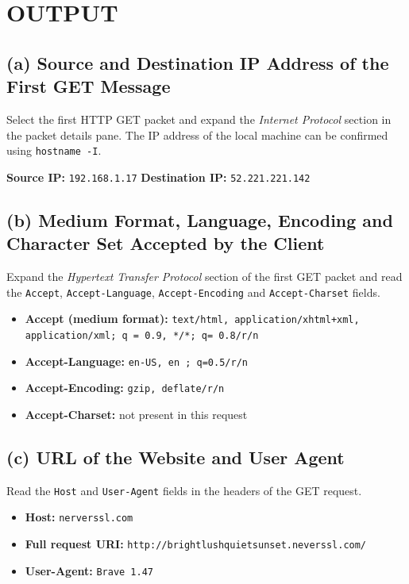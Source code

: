 \documentclass[12pt,a4paper]{article}
\begin{document}
	\section*{OUTPUT}

	
	\subsection*{(a) Source and Destination IP Address of the First GET Message}
	Select the first HTTP GET packet and expand the \textit{Internet Protocol} section in the packet details pane. The IP address of the local machine can be confirmed using \texttt{hostname -I}.
	
	\textbf{Source IP:} \texttt{192.168.1.17} \hfill \textbf{Destination IP:} \texttt{52.221.221.142}
	
	\subsection*{(b) Medium Format, Language, Encoding and Character Set Accepted by the Client}
	Expand the \textit{Hypertext Transfer Protocol} section of the first GET packet and read the \texttt{Accept}, \texttt{Accept-Language}, \texttt{Accept-Encoding} and \texttt{Accept-Charset} fields.
	
	\begin{itemize}
		\item \textbf{Accept (medium format):} \texttt{text/html, application/xhtml+xml, application/xml; q = 0.9, */*; q= 0.8/r/n}
		\item \textbf{Accept-Language:} \texttt{en-US, en ; q=0.5/r/n}
		\item \textbf{Accept-Encoding:} \texttt{gzip, deflate/r/n}
		\item \textbf{Accept-Charset:} not present in this request
	\end{itemize}
	
	\subsection*{(c) URL of the Website and User Agent}
	Read the \texttt{Host} and \texttt{User-Agent} fields in the headers of the GET request.
	
	\begin{itemize}
		\item \textbf{Host:} \texttt{nerverssl.com}
		\item \textbf{Full request URI:} \texttt{http://brightlushquietsunset.neverssl.com/}
		\item \textbf{User-Agent:} \texttt{Brave 1.47}
	\end{itemize}
	
\end{document}
